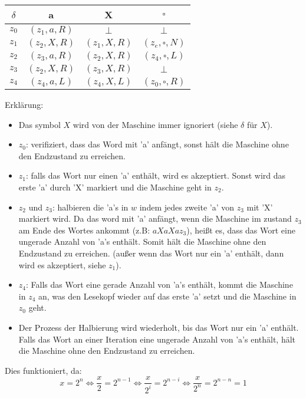 \documentclass[a4paper,onecolumn,oneside,12pt,ngerman]{article}
\theoremstyle{plain} %
\theoremstyle{definition} %
\theoremstyle{remark} %
\theoremstyle{plain}
\begin{document}
\begin{center}
	\begin{tabular}{c|ccc}
	$\delta$ & a & X & $\square$ \\ \hline
	$z_0$ & $(z_1, a, R)$ & $\bot$ & $\bot$ \\
	$z_1$ & $(z_2, X, R)$ & $(z_1, X, R)$ & $(z_e, \square, N)$ \\
	$z_2$ & $(z_3, a, R)$ &$(z_2,X,R)$ & $(z_4, \square, L)$ \\
	$z_3$ & $(z_2, X, R)$ & $(z_3,X,R)$ & $\bot$ \\
	$z_4$ & $(z_4, a, L)$ & $(z_4, X, L)$ & $(z_0, \square, R)$ \\
	\end{tabular}
\end{center}

Erklärung:

\begin{itemize}
	\item Das symbol $X$ wird von der Maschine immer ignoriert (siehe $\delta$ für $X$).
	\item $z_0$: verifiziert, dass das Word mit 'a' anfängt, 
	sonst hält die Maschine ohne den Endzustand zu erreichen.
	\item $z_1$: falls das Wort nur einen 'a' enthält, wird es akzeptiert. 
	Sonst wird das erste 'a' durch 'X' markiert und die Maschine geht in $z_2$.
	\item $z_2$ und $z_3$: halbieren die 'a's in $w$ indem jedes zweite 'a' von $z_3$
	mit 'X' markiert wird. Da das word mit 'a' anfängt, wenn die Maschine im zustand $z_3$
	am Ende des Wortes ankommt (z.B: $aXaXaz_3$), heißt es, dass das Wort eine ungerade 
	Anzahl von 'a's enthält. Somit hält die Maschine ohne den Endzustand zu erreichen.
	(außer wenn das Wort nur ein 'a' enthält, dann wird es akzeptiert, siehe $z_1$).
	\item $z_4$: Falls das Wort eine gerade Anzahl von 'a's enthält, kommt die Maschine
	in $z_4$ an, was den Lesekopf wieder auf das erste 'a' setzt und die Maschine in $z_0$ geht.
	\item Der Prozess der Halbierung wird wiederholt, bis das Wort nur ein 'a' enthält.
	Falls das Wort an einer Iteration eine ungerade Anzahl von 'a's enthält, hält die Maschine ohne den Endzustand zu erreichen.
\end{itemize}
Dies funktioniert, da:
\[x = 2^n \Leftrightarrow \frac{x}{2} = 2^{n-1} \Leftrightarrow \frac{x}{2^i} = 2^{n-i} \Leftrightarrow \frac{x}{2^n} = 2^{n-n} = 1\]
\end{document}
